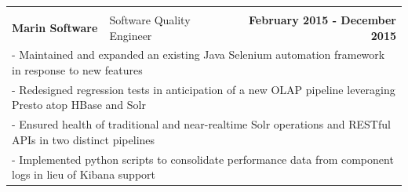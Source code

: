 \documentclass[letterpaper]{article}
\begin{document}
\begin{center}
\begin{tabular}{p{}p{}r}
		  \\
		  \\
				\textbf{Marin Software}									&
				Software Quality Engineer										&
				\textbf{February 2015 - December 2015 \quad}
			\\
				\multicolumn{3}{p{\textwidth}}{\quad\quad - Maintained and expanded an existing Java Selenium automation framework in response to new features} 
			\\
				\multicolumn{3}{p{\textwidth}}{\quad\quad - Redesigned regression tests in anticipation of a new OLAP pipeline leveraging Presto atop HBase and Solr} 
			\\
				\multicolumn{3}{p{\textwidth}}{\quad\quad - Ensured health of traditional and near-realtime Solr operations and RESTful APIs in two distinct pipelines } 
			\\
				\multicolumn{3}{p{\textwidth}}{\quad\quad - Implemented python scripts to consolidate performance data from component logs in lieu of Kibana support } 
			\\

\end{tabular}
\end{center}
\end{document}
